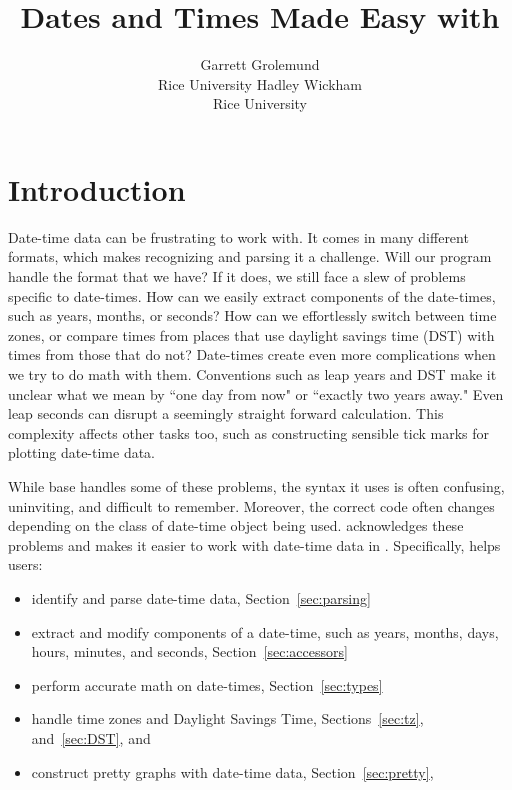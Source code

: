 \documentclass[article]{jss}
\author{Garrett Grolemund\\Rice University \And 
        Hadley Wickham\\Rice University}
\title{Dates and Times Made Easy with \pkg{lubridate}}
\begin{document}
\section{Introduction}

Date-time data can be frustrating to work with. It comes in many different formats, which makes recognizing and parsing it a challenge. Will our program handle the format that we have? If it does, we still face a slew of problems specific to date-times. How can we easily extract components of the date-times, such as years, months, or seconds? How can we effortlessly switch between time zones, or compare times from places that use daylight savings time (DST) with times from those that do not? Date-times create even more complications when we try to do math with them. Conventions such as leap years and DST make it unclear what we mean by ``one day from now" or ``exactly two years away."  Even leap seconds can disrupt a seemingly straight forward calculation.  This complexity affects other tasks too, such as constructing sensible tick marks for plotting date-time data.

While base  handles some of these problems, the syntax it uses is often confusing, uninviting, and difficult to remember. Moreover, the correct  code often changes depending on the class of date-time object being used.  acknowledges these problems and makes it easier to work with date-time data in . Specifically,  helps users:

\begin{itemize}
   \item identify and parse date-time data, Section~\ref{sec:parsing} 
   
    \item extract and modify components of a date-time, such as years, months, days, hours, minutes, and seconds, Section~\ref{sec:accessors}
  
  \item perform accurate math on date-times, Section~\ref{sec:types}
    
  \item handle time zones and Daylight Savings Time, Sections~\ref{sec:tz}, and~\ref{sec:DST}, and
  
   \item construct pretty graphs with date-time data, Section~\ref{sec:pretty}, 
  
\end{itemize}
\end{document}
